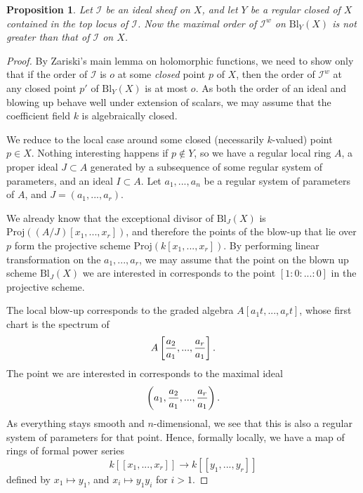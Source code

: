 \documentclass[12pt,a4paper,leqno]{article}
\newcommand{\bl}{\mathrm{Bl}}
\newcommand{\proj}{\mathrm{Proj}}
\theoremstyle{plain}
\newtheorem{prop}[theo]{Proposition}
\theoremstyle{definition}
\theoremstyle{remark}
\begin{document}
\begin{prop}
Let $\mathscr{I}$ be an ideal sheaf on $X$, and let $Y$ be a regular closed of $X$ contained in the top locus of $\mathscr{I}$. Now the maximal order of $\mathscr{I}^w$ on $\bl_{Y} (X)$ is not greater than that of $\mathscr{I}$ on $X$.
\end{prop}
\begin{proof}
By Zariski's main lemma on holomorphic functions, we need to show only that if the order of $\mathscr{I}$ is $o$ at some \emph{closed} point $p$ of $X$, then the order of $\mathscr{I}^w$ at any closed point $p'$ of $\bl_{Y} (X)$ is at most $o$. As both the order of an ideal and blowing up behave well under extension of scalars, we may assume that the coefficient field $k$ is algebraically closed.

We reduce to the local case around some closed (necessarily $k$-valued) point $p \in X$. Nothing interesting happens if $p \not\in Y$, so we have a regular local ring $A$, a proper ideal $J \subset A$ generated by a subsequence of some regular system of parameters, and an ideal $I \subset A$. Let $a_1,...,a_n$ be a regular system of parameters of $A$, and $J = (a_1,...,a_r)$. 


We already know that the exceptional divisor of $\bl_J (X)$ is $\proj ((A/J) [x_1,...,x_r])$, and therefore the points of the blow-up that lie over $p$ form the projective scheme $\proj (k[x_1,...,x_r])$. By performing linear transformation on the $a_1,...,a_r$, we may assume that the point on the blown up scheme $\bl_{J} (X)$ we are interested in corresponds to the point $[1:0:...:0]$ in the projective scheme.

The local blow-up corresponds to the graded algebra $A[a_1 t, ..., a_r t]$, whose first chart is the spectrum of 
\begin{equation*}
A \left[ {a_2 \over a_1}, ... , {a_r \over a_1} \right].
\end{equation*}
The point we are interested in corresponds to the maximal ideal
\begin{equation*}
\left( a_1, {a_2 \over a_1}, ... , {a_r \over a_1} \right).
\end{equation*}
As everything stays smooth and $n$-dimensional, we see that this is also a regular system of parameters for that point. Hence, formally locally, we have a map of rings of formal power series
\begin{equation*}
k[[x_1,...,x_r]] \to k[[y_1,...,y_r]]
\end{equation*}
defined by $x_1 \mapsto y_1$, and $x_i \mapsto y_1 y_i$ for $i>1$.


\end{proof}
\end{document}
